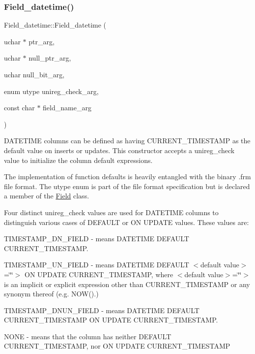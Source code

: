 \subsubsection{\texorpdfstring{Field\+\_\+datetime()}{Field\_datetime()}}
{\footnotesize\ttfamily Field\+\_\+datetime\+::\+Field\+\_\+datetime (\begin{DoxyParamCaption}\item[{uchar $\ast$}]{ptr\+\_\+arg,  }\item[{uchar $\ast$}]{null\+\_\+ptr\+\_\+arg,  }\item[{uchar}]{null\+\_\+bit\+\_\+arg,  }\item[{enum utype}]{unireg\+\_\+check\+\_\+arg,  }\item[{const char $\ast$}]{field\+\_\+name\+\_\+arg }\end{DoxyParamCaption})\hspace{0.3cm}{\ttfamily [inline]}}

D\+A\+T\+E\+T\+I\+ME columns can be defined as having C\+U\+R\+R\+E\+N\+T\+\_\+\+T\+I\+M\+E\+S\+T\+A\+MP as the default value on inserts or updates. This constructor accepts a unireg\+\_\+check value to initialize the column default expressions.

The implementation of function defaults is heavily entangled with the binary .frm file format. The {\ttfamily utype} {\ttfamily enum} is part of the file format specification but is declared a member of the \mbox{\hyperlink{classField}{Field}} class.

Four distinct unireg\+\_\+check values are used for D\+A\+T\+E\+T\+I\+ME columns to distinguish various cases of D\+E\+F\+A\+U\+LT or ON U\+P\+D\+A\+TE values. These values are\+:


\begin{DoxyItemize}
\item T\+I\+M\+E\+S\+T\+A\+M\+P\+\_\+\+D\+N\+\_\+\+F\+I\+E\+LD -\/ means D\+A\+T\+E\+T\+I\+ME D\+E\+F\+A\+U\+LT C\+U\+R\+R\+E\+N\+T\+\_\+\+T\+I\+M\+E\+S\+T\+A\+MP.
\item T\+I\+M\+E\+S\+T\+A\+M\+P\+\_\+\+U\+N\+\_\+\+F\+I\+E\+LD -\/ means D\+A\+T\+E\+T\+I\+ME D\+E\+F\+A\+U\+LT $<$default value$>$=\char`\"{}\char`\"{}$>$ ON U\+P\+D\+A\+TE C\+U\+R\+R\+E\+N\+T\+\_\+\+T\+I\+M\+E\+S\+T\+A\+MP, where $<$default value$>$=\char`\"{}\char`\"{}$>$ is an implicit or explicit expression other than C\+U\+R\+R\+E\+N\+T\+\_\+\+T\+I\+M\+E\+S\+T\+A\+MP or any synonym thereof (e.\+g. N\+O\+W().)
\item T\+I\+M\+E\+S\+T\+A\+M\+P\+\_\+\+D\+N\+U\+N\+\_\+\+F\+I\+E\+LD -\/ means D\+A\+T\+E\+T\+I\+ME D\+E\+F\+A\+U\+LT C\+U\+R\+R\+E\+N\+T\+\_\+\+T\+I\+M\+E\+S\+T\+A\+MP ON U\+P\+D\+A\+TE C\+U\+R\+R\+E\+N\+T\+\_\+\+T\+I\+M\+E\+S\+T\+A\+MP.
\item N\+O\+NE -\/ means that the column has neither D\+E\+F\+A\+U\+LT C\+U\+R\+R\+E\+N\+T\+\_\+\+T\+I\+M\+E\+S\+T\+A\+MP, nor ON U\+P\+D\+A\+TE C\+U\+R\+R\+E\+N\+T\+\_\+\+T\+I\+M\+E\+S\+T\+A\+MP 
\end{DoxyItemize}

